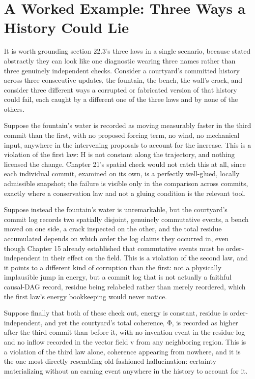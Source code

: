 \section{A Worked Example: Three Ways a History Could Lie}

It is worth grounding section 22.3's three laws in a single scenario, because stated abstractly they can look like one diagnostic wearing three names rather than three genuinely independent checks. Consider a courtyard's committed history across three consecutive updates, the fountain, the bench, the wall's crack, and consider three different ways a corrupted or fabricated version of that history could fail, each caught by a different one of the three laws and by none of the others.

Suppose the fountain's water is recorded as moving measurably faster in the third commit than the first, with no proposed forcing term, no wind, no mechanical input, anywhere in the intervening proposals to account for the increase. This is a violation of the first law: H is not constant along the trajectory, and nothing licensed the change. Chapter 21's spatial check would not catch this at all, since each individual commit, examined on its own, is a perfectly well-glued, locally admissible snapshot; the failure is visible only in the comparison across commits, exactly where a conservation law and not a gluing condition is the relevant tool.

Suppose instead the fountain's water is unremarkable, but the courtyard's commit log records two spatially disjoint, genuinely commutative events, a bench moved on one side, a crack inspected on the other, and the total residue accumulated depends on which order the log claims they occurred in, even though Chapter 15 already established that commutative events must be order-independent in their effect on the field. This is a violation of the second law, and it points to a different kind of corruption than the first: not a physically implausible jump in energy, but a commit log that is not actually a faithful causal-DAG record, residue being relabeled rather than merely reordered, which the first law's energy bookkeeping would never notice.

Suppose finally that both of these check out, energy is constant, residue is order-independent, and yet the courtyard's total coherence, Φ, is recorded as higher after the third commit than before it, with no invention event in the residue log and no inflow recorded in the vector field v from any neighboring region. This is a violation of the third law alone, coherence appearing from nowhere, and it is the one most directly resembling old-fashioned hallucination: certainty materializing without an earning event anywhere in the history to account for it.


